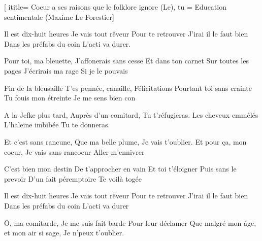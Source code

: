  [
ititle= {Coeur a ses raisons que le folklore ignore (Le)},
tu = {Education sentimentale (Maxime Le Forestier}]


\beginverse
Il est dix-huit heures 
Je vais tout rêveur
Pour te retrouver
J'irai il le faut bien 
Dans les préfabs du coin 
L'acti va durer.
\endverse

\beginverse
Pour toi, ma bleuette,
J'affonerais sans cesse
Et dans ton carnet
Sur toutes les pages
J'écrirais ma rage
Si je le pouvais
\endverse

\beginverse
Fin de la bleusaille
T'es pennée, canaille,
Félicitations
Pourtant toi sans crainte
Tu fouis mon étreinte
Je me sens bien con
\endverse

\beginverse
A la Jefke plus tard,
Auprès d'un comitard,
Tu t'réfugieras.
Les cheveux emmêlés
L'haleine imbibée
Tu te donneras.
\endverse

\beginverse
Et c'est sans rancune,
Que ma belle plume,
Je vais t'oublier.
Et pour ça, mon coeur,
Je vais sans rancoeur
Aller m'ennivrer
\endverse

\beginverse
C'est bien mon destin
De t'approcher en vain
Et toi t'éloigner
Puis sans le prevoir
D'un fait péremptoire
Te voilà togée
\endverse

\beginverse
Il est dix-huit heures
Je vais tout rêveur
Pour te retrouver
J'irai il le faut bien
Dans les préfabs du coin
L'acti va durer
\endverse

\beginverse
Ô, ma comitarde,
Je me suis fait barde
Pour leur déclamer
Que malgré mon âge,
et mon air si sage,
Je n'peux t'oublier.
\endverse

\endsong